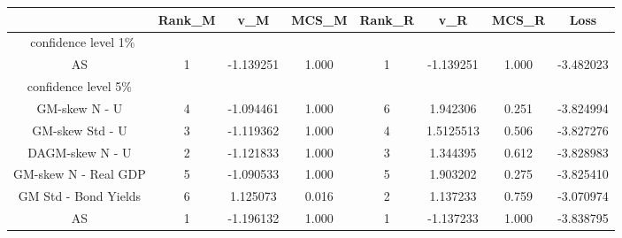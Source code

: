 \documentclass{article}
\begin{document}


\begin{table}[ht] \small
\centering
\begin{tabular}{cccccccc}
\hline
 & Rank\_M  & v\_M & MCS\_M & Rank\_R & v\_R & MCS\_R & Loss \\
\hline
\
confidence level 1\%\\
AS & 1 & -1.139251 & 1.000 & 1 & -1.139251 & 1.000 & -3.482023\\
\hline
confidence level 5\% \\
GM-skew N - U & 4 & -1.094461 & 1.000 & 6 & 1.942306 & 0.251 & -3.824994 \\
GM-skew Std - U & 3 & -1.119362 & 1.000 & 4 & 1.5125513 & 0.506 & -3.827276 \\
DAGM-skew N - U & 2 & -1.121833 & 1.000 & 3 & 1.344395 & 0.612 & -3.828983\\
GM-skew N - Real GDP & 5 & -1.090533 & 1.000 & 5 & 1.903202 & 0.275 & -3.825410\\
GM Std - Bond Yields & 6 &  1.125073 & 0.016 & 2 & 1.137233 & 0.759 & -3.070974\\
AS & 1 & -1.196132 & 1.000 & 1 & -1.137233 & 1.000 & -3.838795\\
\end{tabular}
\end{table}
\end{document}
